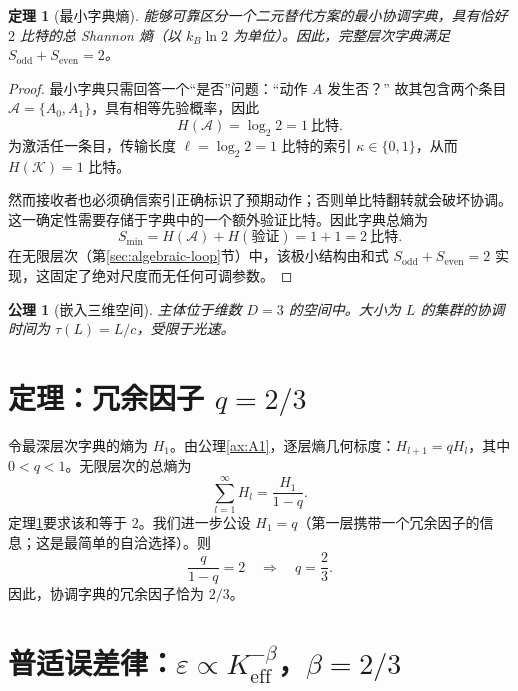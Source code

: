 \documentclass[12pt,a4paper]{article}
\newtheorem{axiom}{公理}
\newtheorem{theorem}{定理}[section]
\begin{document}
	\begin{theorem}[最小字典熵]
		\label{thm:minimal-dict}
		能够可靠区分一个二元替代方案的最小协调字典，具有恰好 \(2\) 比特的总 Shannon 熵（以 \(k_B\ln 2\) 为单位）。因此，完整层次字典满足 \(S_{\mathrm{odd}} + S_{\mathrm{even}} = 2\)。
	\end{theorem}
	
	\begin{proof}
		最小字典只需回答一个“是否”问题：“动作 \(A\) 发生否？” 故其包含两个条目 \(\mathcal{A} = \{A_0, A_1\}\)，具有相等先验概率，因此
		\[
		H(\mathcal{A}) = \log_2 2 = 1\ \text{比特}.
		\]
		为激活任一条目，传输长度 \(\ell = \log_2 2 = 1\) 比特的索引 \(\kappa \in \{0,1\}\)，从而 \(H(\mathcal{K}) = 1\) 比特。
		
		然而接收者也必须确信索引正确标识了预期动作；否则单比特翻转就会破坏协调。这一确定性需要存储于字典中的一个额外验证比特。因此字典总熵为
		\[
		S_{\min} = H(\mathcal{A}) + H(\text{验证}) = 1 + 1 = 2\ \text{比特}.
		\]
		在无限层次（第\ref{sec:algebraic-loop}节）中，该极小结构由和式 \(S_{\mathrm{odd}} + S_{\mathrm{even}} = 2\) 实现，这固定了绝对尺度而无任何可调参数。
	\end{proof}
	
	\begin{axiom}[嵌入三维空间] \label{ax:A3}
		主体位于维数 \(D = 3\) 的空间中。大小为 \(L\) 的集群的协调时间为 \(\tau(L) = L/c\)，受限于光速。
	\end{axiom}
	
	
	\section{定理：冗余因子 \(q = 2/3\)}
	
	令最深层次字典的熵为 \(H_1\)。由公理\ref{ax:A1}，逐层熵几何标度：\(H_{l+1} = q H_l\)，其中 \(0 < q < 1\)。无限层次的总熵为
	\[
	\sum_{l=1}^{\infty} H_l = \frac{H_1}{1-q}.
	\]
	定理\ref{thm:minimal-dict}要求该和等于 \(2\)。我们进一步公设 \(H_1 = q\)（第一层携带一个冗余因子的信息；这是最简单的自洽选择）。则
	\begin{equation}
		\frac{q}{1-q} = 2 \quad\Longrightarrow\quad \boxed{q = \frac{2}{3}}.
		\label{eq:q}
	\end{equation}
	因此，协调字典的冗余因子恰为 \(2/3\)。
	
	\section{普适误差律：\(\varepsilon \propto K_{\mathrm{eff}}^{-\beta}\)，\(\beta = 2/3\)}
	
\end{document}
